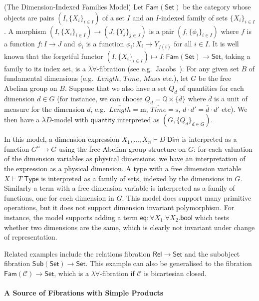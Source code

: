 \documentclass[a4paper,UKenglish]{lipics}
\newcommand{\msf}[1]{\mathsf{#1}} %
\newcommand{\Set}{\msf{Set}}
\newcommand{\Fam}[1]{\msf{Fam}(#1)}
\newcommand{\Sub}[1]{\msf{Sub}(#1)}
\newcommand{\Rel}{\msf{Rel}}
\newcommand{\C}{\mathcal{C}}
\newcommand{\bbQ}{\mathbb{Q}}
\newcommand{\qnt}{\msf{quantity}}
\newcommand{\bool}{\msf{bool}}
\newcommand{\lengthDim}{\mathit{Length}}
\newcommand{\timeDim}{\mathit{Time}}
\newcommand{\massDim}{\mathit{Mass}}
\newcommand{\Tj}[2]{#1 \vdash #2 \; \msf{ Type}}
\newcommand{\Dj}[2]{#1 \vdash #2 \; \msf{ Dim}}
\newcommand{\Dim}{D}
\newcommand{\Dvar}{X}
\begin{document}
\begin{example}(The Dimension-Indexed Families Model)
\label{example:famset}
Let $\Fam\Set$ be the category whose objects are pairs
$(I,\{X_i\}_{i\in I})$ of a set $I$ and an $I$-indexed family of sets
$\{X_i\}_{i\in I}$. A morphism $(I,\{X_i\}_{i\in I}) \to
(J,\{Y_j\}_{j\in J})$ is a pair $(f,\{\phi_i\}_{i\in I})$ where $f$ is
a function $f:I\to J$ and $\phi_i$ is a function $\phi_i:X_i\to
Y_{f(i)}$ for all $i\in I$. It is well known that the forgetful
functor $(I,\{X_i\}_{i\in I}) \mapsto I : \Fam\Set\to \Set$, taking a
family to its index set, is a $\lambda\forall$-fibration (see e.g.\
Jacobs~\cite[Lemma 1.9.5]{jacobs1999categorical}).  For any given set
$B$ of fundamental dimensions (e.g.\ $\lengthDim$, $\timeDim$, $\massDim$ etc.), let $G$ be
the free Abelian group on $B$. Suppose that we also have a set $Q_d$
of quantities for each dimension $d \in G$ (for instance, we can
choose $Q_d = \bbQ \times \{ \overline{d} \}$ where $\overline{d}$ is
a unit of measure for the dimension $d$, e.g.\
$\overline{\lengthDim} = \mathrm m$, $\overline{\timeDim} = \mathrm s$,
$\overline{d\cdot d'} = \overline{d}\cdot\overline{d'}$ etc). We then
have a $\lambda D$-model with $\qnt$ interpreted as $(G,\{Q_d\}_{d\in
  G})$.

In this model, a dimension expression $\Dj{\Dvar_1,\dots, \Dvar_n}
\Dim$ is interpreted as a function $G^n\to G$ using the free Abelian
group structure on $G$: for each valuation of the dimension variables
as physical dimensions, we have an interpretation of the expression as
a physical dimension. A type with a free dimension variable $\Tj \Dvar
T$ is interpreted as a family of sets, indexed by the dimensions in
$G$. Similarly a term with a free dimension variable is interpreted as
a family of functions, one for each dimension in $G$. This model does
support many primitive operations, but it does not support dimension
invariant polymorphism. For instance, the model supports adding a term
$\mathsf{eq}:\forall \Dvar_1.\forall \Dvar_2.\bool$ which tests
whether two dimensions are the same, which is clearly not invariant
under change of representation.
\end{example}

Related examples include the relations fibration $\Rel \to \Set$ and
the subobject fibration $\Sub{\Set} \to \Set$. This example can also
be generalised to the fibration $\Fam{\C}\to\Set$, which is a
$\lambda\forall$-fibration if $\C$ is bicartesian closed.

\paragraph*{A Source of Fibrations with Simple Products}
\end{document}
